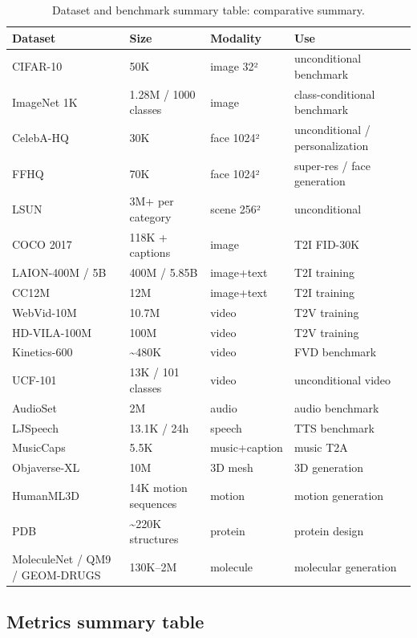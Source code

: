 \documentclass{article}
\begin{document}
\begin{table}[t]
\centering
\caption{Dataset and benchmark summary table: comparative summary.}
\label{tab:dataset-and-benchmark-summary-table}
\begin{tabular}{>{\raggedright\arraybackslash}p{0.3191\linewidth}
  >{\raggedright\arraybackslash}p{0.2128\linewidth}
  >{\raggedright\arraybackslash}p{0.1383\linewidth}
  >{\raggedright\arraybackslash}p{0.3298\linewidth}}
\toprule
Dataset & Size & Modality & Use \\
\midrule
CIFAR-10 & 50K & image 32² & unconditional benchmark \\
ImageNet 1K & 1.28M / 1000 classes & image & class-conditional benchmark \\
CelebA-HQ & 30K & face 1024² & unconditional / personalization \\
FFHQ & 70K & face 1024² & super-res / face generation \\
LSUN & 3M+ per category & scene 256² & unconditional \\
COCO 2017 & 118K + captions & image & T2I FID-30K \\
LAION-400M / 5B & 400M / 5.85B & image+text & T2I training \\
CC12M & 12M & image+text & T2I training \\
WebVid-10M & 10.7M & video & T2V training \\
HD-VILA-100M & 100M & video & T2V training \\
Kinetics-600 & \textasciitilde480K & video & FVD benchmark \\
UCF-101 & 13K / 101 classes & video & unconditional video \\
AudioSet & 2M & audio & audio benchmark \\
LJSpeech & 13.1K / 24h & speech & TTS benchmark \\
MusicCaps & 5.5K & music+caption & music T2A \\
Objaverse-XL & 10M & 3D mesh & 3D generation \\
HumanML3D & 14K motion sequences & motion & motion generation \\
PDB & \textasciitilde220K structures & protein & protein design \\
MoleculeNet / QM9 / GEOM-DRUGS & 130K--2M & molecule & molecular generation \\
\end{tabular}
\end{table}

\subsection{Metrics summary table}\label{metrics-summary-table}
\end{document}
